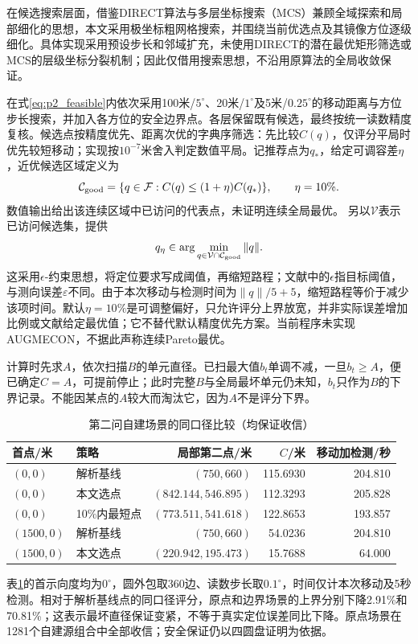 \documentclass{JXUSTmodeling}
\begin{document}
在候选搜索层面，借鉴DIRECT算法\cite{jones1993}与多层坐标搜索（MCS）\cite{huyer1999}兼顾全域探索和局部细化的思想，本文采用极坐标粗网格搜索，并围绕当前优选点及其镜像方位逐级细化。具体实现采用预设步长和邻域扩充，未使用DIRECT的潜在最优矩形筛选或MCS的层级坐标分裂机制；因此仅借用搜索思想，不沿用原算法的全局收敛保证。

在式\eqref{eq:p2_feasible}内依次采用100米/$5^\circ$、20米/$1^\circ$及5米/$0.25^\circ$的移动距离与方位步长搜索，并加入各方位的安全边界点。各层保留既有候选，最终按统一读数精度复核。候选点按精度优先、距离次优的字典序筛选\cite{mavrotas2009}：先比较$C(q)$，仅评分平局时优先较短移动；实现按$10^{-7}$米舍入判定数值平局。记推荐点为$q_*$，给定可调容差$\eta$，近优候选区域定义为
\begin{equation}
 \mathcal C_{\rm good}=\{q\in\mathcal F:C(q)\le(1+\eta)C(q_*)\},\qquad \eta=10\%.
\end{equation}
数值输出给出该连续区域中已访问的代表点，未证明连续全局最优。
另以$\mathcal V$表示已访问候选集，提供
\begin{equation}
 q_\eta\in\arg\min_{q\in\mathcal V\cap\mathcal C_{\rm good}}\|q\|.
 \label{eq:p2_epsilon_selection}
\end{equation}
这采用$\epsilon$-约束思想\cite{mavrotas2009}，将定位要求写成阈值，再缩短路程；文献中的$\epsilon$指目标阈值，与测向误差$\varepsilon$不同。由于本次移动与检测时间为$\|q\|/5+5$，缩短路程等价于减少该项时间。默认$\eta=10\%$是可调整偏好，只允许评分上界放宽，并非实际误差增加比例或文献给定最优值；它不替代默认精度优先方案。当前程序未实现AUGMECON，不据此声称连续Pareto最优。

计算时先求$A$，依次扫描$B$的单元直径。已扫最大值$b_t$单调不减，一旦$b_t\ge A$，便已确定$C=A$，可提前停止；此时完整$B$与全局最坏单元仍未知，$b_t$只作为$B$的下界记录。不能因某点的$A$较大而淘汰它，因为$A$不是评分下界。

\begin{table}[htbp]
 \centering
 \caption{第二问自建场景的同口径比较（均保证收信）}
 \label{tab:p2_selection}
 \begin{tabular}{llrrr}
 \hline
 首点/米 & 策略 & 局部第二点/米 & $C$/米 & 移动加检测/秒\\
 \hline
 $(0,0)$ & 解析基线 & $(750,660)$ & 115.6930 & 204.810\\
 $(0,0)$ & 本文选点 & $(842.144,546.895)$ & 112.3293 & 205.828\\
 $(0,0)$ & 10\%内最短点 & $(773.511,541.618)$ & 122.8653 & 193.857\\
 $(1500,0)$ & 解析基线 & $(750,660)$ & 54.0236 & 204.810\\
 $(1500,0)$ & 本文选点 & $(220.942,195.473)$ & 15.7688 & 64.000\\
 \hline
 \end{tabular}
\end{table}
表\ref{tab:p2_selection}的首示向度均为$0^\circ$，圆外包取360边、读数步长取$0.1^\circ$，时间仅计本次移动及5秒检测。相对于解析基线点的同口径评分，原点和边界场景的上界分别下降2.91\%和70.81\%；这表示最坏直径保证变紧，不等于真实定位误差同比下降。原点场景在1281个自建源组合中全部收信；安全保证仍以四圆盘证明为依据。
\end{document}
